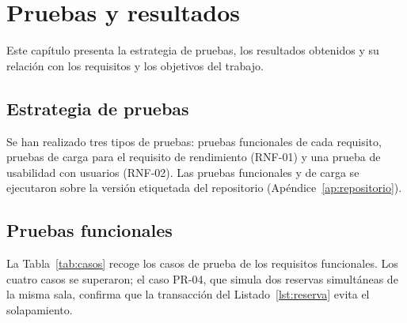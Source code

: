 \chapter{Pruebas y resultados}
\label{cap:pruebas}

Este capítulo presenta la estrategia de pruebas, los resultados obtenidos y su
relación con los requisitos y los objetivos del trabajo.

\section{Estrategia de pruebas}
\label{sec:estrategia}

Se han realizado tres tipos de pruebas: pruebas funcionales de cada requisito,
pruebas de carga para el requisito de rendimiento (RNF-01) y una prueba de
usabilidad con usuarios (RNF-02). Las pruebas funcionales y de carga se
ejecutaron sobre la versión etiquetada \texttt{\tfgversion} del repositorio
(Apéndice~\ref{ap:repositorio}).

\section{Pruebas funcionales}
\label{sec:pruebas-funcionales}

La Tabla~\ref{tab:casos} recoge los casos de prueba de los requisitos
funcionales. Los cuatro casos se superaron; el caso PR-04, que simula dos
reservas simultáneas de la misma sala, confirma que la transacción del
Listado~\ref{lst:reserva} evita el solapamiento.

